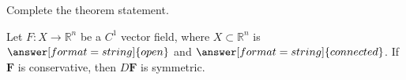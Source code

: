 \begin{problem}
Complete the theorem statement.

Let $F:X\rightarrow\mathbb{R}^n$ be a $C^1$ vector field, where $X\subset\mathbb{R}^n$ is $\answer[format=string]{open}$ and $\answer[format=string]{connected}$. If $\mathbf{F}$ is conservative, then $D\mathbf{F}$ is symmetric.
\end{problem}